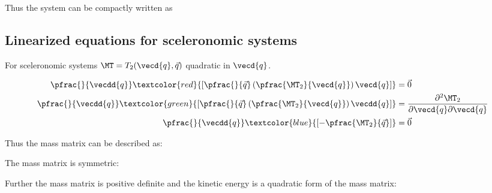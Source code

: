 \documentclass[10pt,a4paper]{scrartcl}
\begin{document}
\begin{multicols*}{2}
Thus the system can be compactly written as 


\subsection{Linearized equations for sceleronomic systems}


For sceleronomic systems $\MT=T_2(\vecd{q},\vec{q})$ quadratic in $\vecd{q}$.


\begin{align*}
\pfrac{}{\vecdd{q}}\textcolor{red}{\left[\pfrac{}{\vec{q}}\left(\pfrac{\MT_2}{\vecd{q}}\right)\vecd{q}\right]}&=\vec{0}\\
\pfrac{}{\vecdd{q}}\textcolor{green}{\left[\pfrac{}{\vec{q}}\left(\pfrac{\MT_2}{\vecd{q}}\right)\vecdd{q}\right]}&=\frac{\partial^2\MT_2}{\partial\vecd{q}\partial\vecd{q}}\\
\pfrac{}{\vecdd{q}}\textcolor{blue}{\left[-\pfrac{\MT_2}{\vec{q}}\right]}&=\vec{0}
\end{align*}

Thus the mass matrix can be described as:


The mass matrix is symmetric:


Further the mass matrix is positive definite and the kinetic energy is a quadratic form of the mass matrix:



\end{multicols*}
\end{document}
